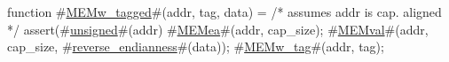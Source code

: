 function #\hyperref[zMEMwzytagged]{MEMw\_tagged}#(addr, tag, data) =
{
  /* assumes addr is cap. aligned */
  assert(#\hyperref[zunsigned]{unsigned}#(addr) %
  #\hyperref[zMEMea]{MEMea}#(addr, cap_size);
  #\hyperref[zMEMval]{MEMval}#(addr, cap_size, #\hyperref[zreversezyendianness]{reverse\_endianness}#(data));
  #\hyperref[zMEMwzytag]{MEMw\_tag}#(addr, tag);
}
